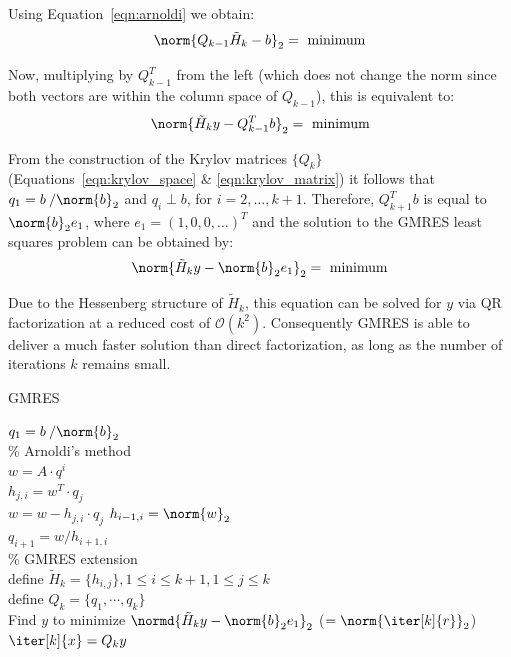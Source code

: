\noindent Using Equation~\hyperref[eqn:arnoldi]{\ref{eqn:arnoldi}} we obtain:
\begin{equation}
    \norm{Q_{k-1}\tilde{H}_k-b}_2=\text{ minimum}
\end{equation}

\noindent Now, multiplying by $Q^T_{k-1}$ from the left (which does not change the norm since both vectors are within the column space of $Q_{k-1}$), this is equivalent to:
\begin{equation}
    \norm{\tilde{H}_ky-Q^T_{k-1}b}_2 = \text{ minimum}
\end{equation}

\noindent From the construction of the Krylov matrices $\{Q_k\}$ (Equations~\hyperref[eqn:krylov_space]{\ref{eqn:krylov_space}} \& \hyperref[eqn:krylov_matrix]{\ref{eqn:krylov_matrix}}) it follows that $q_1=b\:/\norm{b}_2$ and $q_i \perp b$, for $i = 2, \dots, k+1$. Therefore, $Q^T_{k+1}b$ is equal to $\norm{b}_2e_1$, where $e_1=(1,0,0,\dots)^T$ and the solution to the GMRES least squares problem can be obtained by:
\begin{equation}
    \norm{\tilde{H}_ky-\norm{b}_2e_1}_2 = \text{ minimum}
\end{equation}

\noindent Due to the Hessenberg structure of $\tilde{H}_k$, this equation can be solved for $y$ via QR factorization at a reduced cost of $\mathcal{O}(k^2)$. Consequently GMRES is able to deliver a much faster solution than direct factorization, as long as the number of iterations $k$ remains small.

\begin{algorithm}[h]
  \caption{GMRES}
  \label{alg:gmres}
  \SetAlgoLined
  \DontPrintSemicolon
  $q_1= b\:/\norm{b}_2$ \\
  \% Arnoldi's method \\
   {
    $w =A\cdot q^i$ \\
     {
      $h_{j,i} = w^T\cdot q_j$ \\
      $ w = w - h_{j,i}\cdot q_j$}
    $h_{i-1,i} = \norm{w}_2$ \\
    $q_{i+1} = w/h_{i+1,i}$ \\
  }
  \;
  \% GMRES extension \\
  define $\tilde{H}_k = \{h_{i,j}\}, 1 \leq i \leq k+1, 1 \leq j \leq k$ \\
  define $Q_k = \{q_1, \cdots, q_k\}$ \\
  Find $y$ to minimize $\normd{\tilde{H}_ky-\norm{b}_2e_1}_2$ ($=\norm{\iter[k]{r}}_2$) \\
  $\iter[k]{x} = Q_ky$
\end{algorithm}

